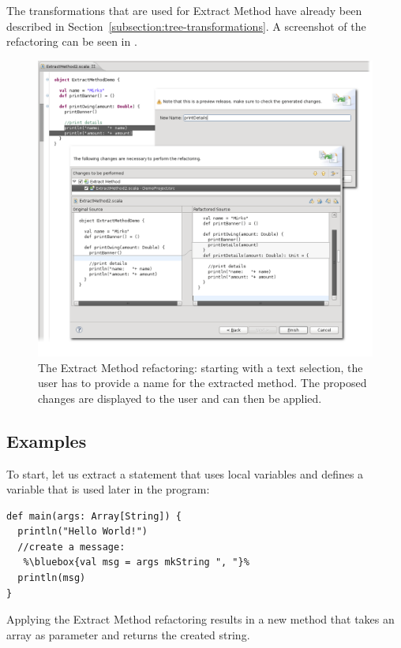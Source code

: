 \documentclass[10pt,a4paper,oneside]{scrreprt}
\begin{document}
The transformations that are used for Extract Method have already been described in Section~\vref{subsection:tree-transformations}. A screenshot of the refactoring can be seen in .

\begin{figure}
  \centering
  \includegraphics[width=\linewidth]{extract_method_screenshot_1.png}
  \caption{The Extract Method refactoring: starting with a text selection, the user has to provide a name for the extracted method. The proposed changes are displayed to the user and can then be applied.}
  \label{figure:extract-method-screenshot-1}
\end{figure}

\subsection{Examples}

To start, let us extract a statement that uses local variables and defines a variable that is used later in the program:

\begin{lstlisting}
def main(args: Array[String]) {
  println("Hello World!")
  //create a message:
   %\bluebox{val msg = args mkString ", "}%
  println(msg)
}
\end{lstlisting}

Applying the Extract Method refactoring results in a new method that takes an array as parameter and returns the created string.
\end{document}
